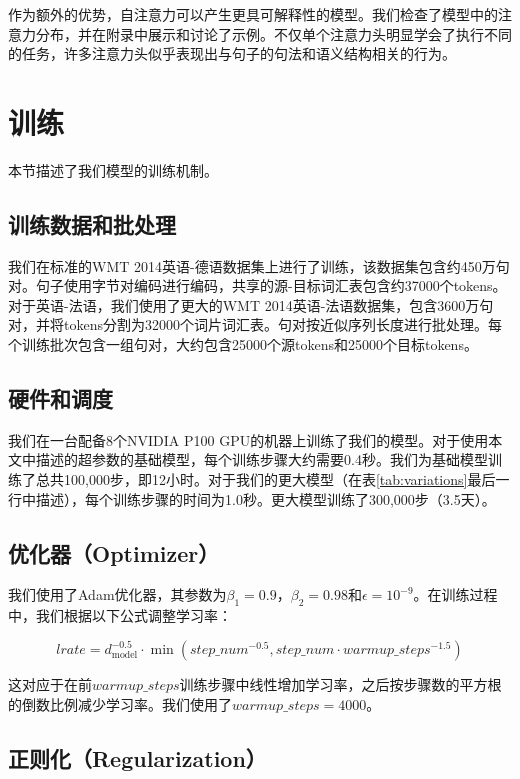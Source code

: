 \documentclass[lang=cn,a4paper,newtx]{elegantpaper}
\newcommand{\dmodel}{d_{\text{model}}}
\begin{document}
作为额外的优势，自注意力可以产生更具可解释性的模型。我们检查了模型中的注意力分布，并在附录中展示和讨论了示例。不仅单个注意力头明显学会了执行不同的任务，许多注意力头似乎表现出与句子的句法和语义结构相关的行为。

\section{训练}

本节描述了我们模型的训练机制。

\subsection{训练数据和批处理}

我们在标准的WMT 2014英语-德语数据集上进行了训练，该数据集包含约450万句对。句子使用字节对编码进行编码，共享的源-目标词汇表包含约37000个tokens。对于英语-法语，我们使用了更大的WMT 2014英语-法语数据集，包含3600万句对，并将tokens分割为32000个词片词汇表。句对按近似序列长度进行批处理。每个训练批次包含一组句对，大约包含25000个源tokens和25000个目标tokens。

\subsection{硬件和调度}

我们在一台配备8个NVIDIA P100 GPU的机器上训练了我们的模型。对于使用本文中描述的超参数的基础模型，每个训练步骤大约需要0.4秒。我们为基础模型训练了总共100,000步，即12小时。对于我们的更大模型（在表\ref{tab:variations}最后一行中描述），每个训练步骤的时间为1.0秒。更大模型训练了300,000步（3.5天）。

\subsection{优化器（Optimizer）}

我们使用了Adam优化器，其参数为$\beta_1=0.9$，$\beta_2=0.98$和$\epsilon=10^{-9}$。在训练过程中，我们根据以下公式调整学习率：

\begin{equation}
lrate = \dmodel^{-0.5} \cdot
  \min({step\_num}^{-0.5},
    {step\_num} \cdot {warmup\_steps}^{-1.5})
\end{equation}

这对应于在前$warmup\_steps$训练步骤中线性增加学习率，之后按步骤数的平方根的倒数比例减少学习率。我们使用了$warmup\_steps=4000$。

\subsection{正则化（Regularization）} \label{sec:reg}
\end{document}
